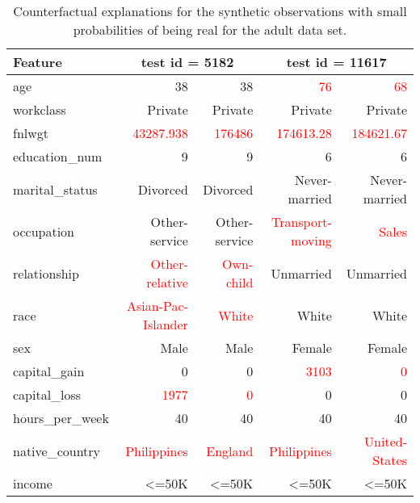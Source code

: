 \begin{table}[ht]
\centering
\begin{tabular}{|l|rr|rr|}
  \toprule
  Feature& \multicolumn{2}{c|}{ test id = 5182}& \multicolumn{2}{c|}{ test id = 11617}\\ \midrule
age & 38 & 38 & \textcolor{red}{76} & \textcolor{red}{68} \\ 
  workclass & Private & Private & Private & Private \\ 
  fnlwgt & \textcolor{red}{43287.938} & \textcolor{red}{176486} & \textcolor{red}{174613.28} & \textcolor{red}{184621.67} \\ 
  education\_num & 9 & 9 & 6 & 6 \\ 
  marital\_status & Divorced & Divorced & Never-married & Never-married \\ 
  occupation & Other-service & Other-service & \textcolor{red}{Transport-moving} & \textcolor{red}{Sales} \\ 
  relationship & \textcolor{red}{Other-relative} & \textcolor{red}{Own-child} & Unmarried & Unmarried \\ 
  race & \textcolor{red}{Asian-Pac-Islander} & \textcolor{red}{White} & White & White \\ 
  sex & Male & Male & Female & Female \\ 
  capital\_gain & 0 & 0 & \textcolor{red}{3103} & \textcolor{red}{0} \\ 
  capital\_loss & \textcolor{red}{1977} & \textcolor{red}{0} & 0 & 0 \\ 
  hours\_per\_week & 40 & 40 & 40 & 40 \\ 
  native\_country & \textcolor{red}{Philippines} & \textcolor{red}{England} & \textcolor{red}{Philippines} & \textcolor{red}{United-States} \\ 
  income & <=50K & <=50K & <=50K & <=50K \\ 
   \bottomrule
\end{tabular}
\caption{Counterfactual explanations for the synthetic observations with small probabilities of being real for the adult data set.} 
\end{table}
